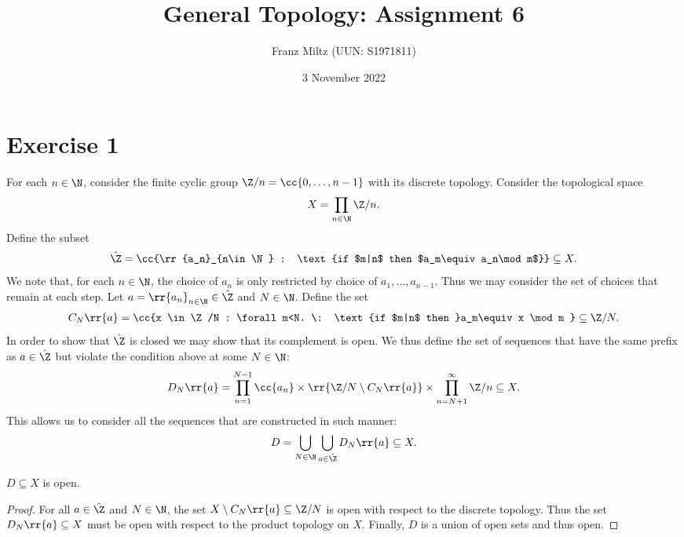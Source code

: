 \documentclass{article}
\begin{document}
\title{General Topology: Assignment 6}
\author{Franz Miltz (UUN: S1971811)}
\date{3 November 2022}
\maketitle

\section*{Exercise 1}

For each $n\in\N$, consider the finite cyclic group $\Z/n=\cc{0,\ldots,n-1}$ with
its discrete topology. Consider the topological space
\begin{align*}
  X=\prod_{n\in\N} \Z/n.
\end{align*}
Define the subset
\begin{align*}
  \hat\Z = \cc{\rr{a_n}_{n\in\N} : \text{if $m|n$ then $a_m\equiv a_n\mod m$}} \subseteq X.
\end{align*}
We note that, for each $n\in\N$, the choice of $a_n$ is only restricted by choice of
$a_1,\ldots,a_{n-1}$. Thus we may consider the set of choices that remain at each step.
Let $a=\rr{a_n}_{n\in\N}\in\hat\Z$ and $N\in\N$. Define the set
\begin{align*}
  C_N\rr{a} = \cc{x \in \Z/N : \forall m<N. \: \text{if $m|n$ then }a_m\equiv x \mod m }\subseteq \Z/N.
\end{align*}
In order to show that $\hat\Z$ is closed we may show that its complement is open. We thus define the
set of sequences that have the same prefix as $a\in\hat\Z$ but violate the condition above
at some $N\in\N$:
\begin{align*}
  D_N\rr{a}=\prod_{n=1}^{N-1}\cc{a_n}\times\rr{\Z/N\setminus C_N\rr{a}}\times \prod_{n=N+1}^{\infty} \Z/n \subseteq X.
\end{align*}
This allows us to consider all the sequences that are constructed in such manner:
\begin{align*}
  D = \bigcup_{N\in\N}\bigcup_{a\in\hat\Z} D_N\rr{a} \subseteq X.
\end{align*}

\begin{claim*}
  $D\subseteq X$ is open.
  \begin{proof}
    For all $a\in\hat\Z$ and $N\in\N$, the set $X\setminus C_N\rr{a}\subseteq \Z/N$ is open with
    respect to the discrete topology. Thus the set $D_N\rr{a}\subseteq X$ must be open
    with respect to the product topology on $X$. Finally, $D$ is a union of open sets and
    thus open.
  \end{proof}
\end{claim*}
\end{document}
